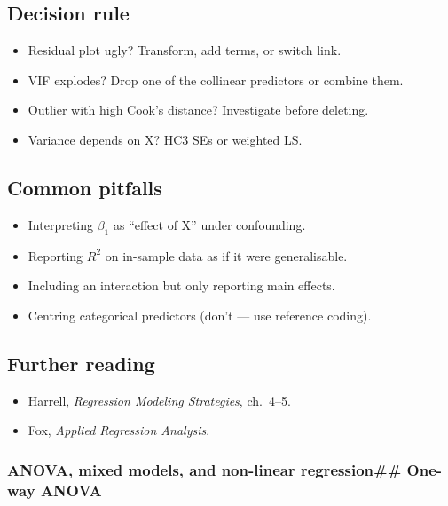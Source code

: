 \documentclass[
]{article}
\providecommand{\tightlist}{%
  \setlength{\itemsep}{0pt}\setlength{\parskip}{0pt}}
\begin{document}
\subsection{Decision rule}\label{decision-rule-4}

\begin{itemize}
\tightlist
\item
  Residual plot ugly? Transform, add terms, or switch link.
\item
  VIF explodes? Drop one of the collinear predictors or combine them.
\item
  Outlier with high Cook's distance? Investigate before deleting.
\item
  Variance depends on X? HC3 SEs or weighted LS.
\end{itemize}

\subsection{Common pitfalls}\label{common-pitfalls-4}

\begin{itemize}
\tightlist
\item
  Interpreting \(\beta_1\) as ``effect of X'' under confounding.
\item
  Reporting \(R^2\) on in-sample data as if it were generalisable.
\item
  Including an interaction but only reporting main effects.
\item
  Centring categorical predictors (don't --- use reference coding).
\end{itemize}

\subsection{Further reading}\label{further-reading-4}

\begin{itemize}
\tightlist
\item
  Harrell, \emph{Regression Modeling Strategies}, ch.~4--5.
\item
  Fox, \emph{Applied Regression Analysis}.
\end{itemize}

\subsubsection{ANOVA, mixed models, and non-linear regression\#\#
One-way
ANOVA}\label{anova-mixed-models-and-non-linear-regression-one-way-anova}
\end{document}
